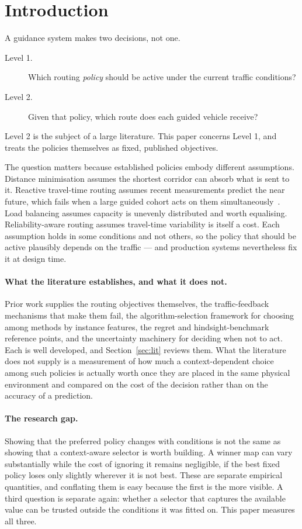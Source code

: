 \section{Introduction}

A guidance system makes two decisions, not one.

\begin{description}
\item[Level 1.] Which routing \emph{policy} should be active under the current
traffic conditions?
\item[Level 2.] Given that policy, which route does each guided vehicle receive?
\end{description}

Level 2 is the subject of a large literature. This paper concerns Level 1, and
treats the policies themselves as fixed, published objectives.

The question matters because established policies embody different assumptions.
Distance minimisation assumes the shortest corridor can absorb what is sent to
it. Reactive travel-time routing assumes recent measurements predict the near
future, which fails when a large guided cohort acts on them
simultaneously~\cite{arnott1991information,acemoglu2018braess}. Load balancing
assumes capacity is unevenly distributed and worth equalising. Reliability-aware
routing assumes travel-time variability is itself a cost. Each assumption holds
in some conditions and not others, so the policy that should be active
plausibly depends on the traffic --- and production systems nevertheless fix it
at design time.

\paragraph{What the literature establishes, and what it does not.}
Prior work supplies the routing objectives themselves, the traffic-feedback
mechanisms that make them fail, the algorithm-selection framework for choosing
among methods by instance features, the regret and hindsight-benchmark
reference points, and the uncertainty machinery for deciding when not to act.
Each is well developed, and Section~\ref{sec:lit} reviews them. What the
literature does not supply is a measurement of how much a context-dependent
choice among such policies is actually worth once they are placed in the same
physical environment and compared on the cost of the decision rather than on
the accuracy of a prediction.

\paragraph{The research gap.}
Showing that the preferred policy changes with conditions is not the same as
showing that a context-aware selector is worth building. A winner map can vary
substantially while the cost of ignoring it remains negligible, if the best
fixed policy loses only slightly wherever it is not best. These are separate
empirical quantities, and conflating them is easy because the first is the more
visible. A third question is separate again: whether a selector that captures
the available value can be trusted outside the conditions it was fitted on.
This paper measures all three.

